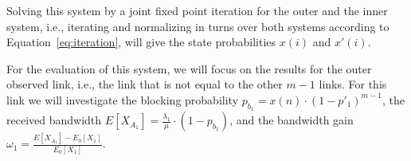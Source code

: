 Solving this system by a joint fixed point iteration for the outer and the inner system, i.e., iterating and normalizing in turns over both systems according to Equation~\ref{eq:iteration}, will give the state probabilities $x(i)$ and $x'(i)$.%

For the evaluation of this system, we will focus on the results for the outer observed link, i.e., the link that is not equal to the other $m-1$ links. For this link we will investigate the blocking probability $p_{b_1} = x(n)\cdot (1-p'_1)^{m-1}$, the received bandwidth $E[X_{A_1}] = \frac{\lambda_1}{\mu}\cdot (1-p_{b_1})$, and the bandwidth gain $\omega_1=\frac{E[X_{A_1}]-E_0[X_1]}{E_0[X_1]}$.
